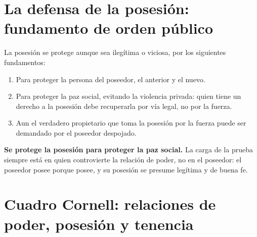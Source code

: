 \documentclass[12pt,oneside]{book}
\begin{document}
\section{La defensa de la posesión: fundamento de orden público}

La posesión se protege aunque sea ilegítima o viciosa, por los siguientes fundamentos:

\begin{enumerate}
    \item Para proteger la persona del poseedor, el anterior y el nuevo.
    \item Para proteger la paz social, evitando la violencia privada: quien tiene un derecho a la posesión debe recuperarla por vía legal, no por la fuerza.
    \item Aun el verdadero propietario que toma la posesión por la fuerza puede ser demandado por el poseedor despojado.
\end{enumerate}

\begin{important}
\textbf{Se protege la posesión para proteger la paz social.} La carga de la prueba siempre está en quien controvierte la relación de poder, no en el poseedor: el poseedor posee porque posee, y su posesión se presume legítima y de buena fe.
\end{important}

\section{Cuadro Cornell: relaciones de poder, posesión y tenencia}
\end{document}
